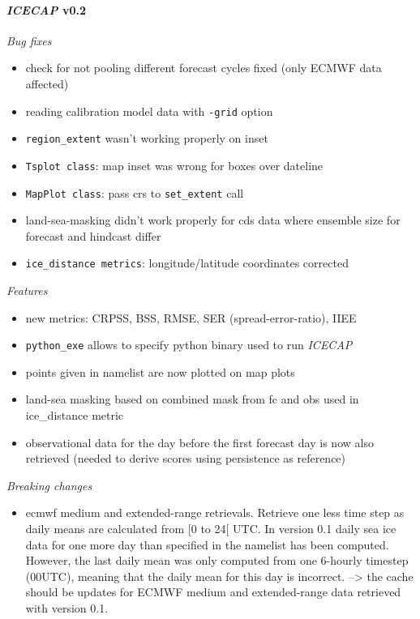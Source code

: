 \documentclass[DIV=10, parskip=full]{scrreprt}
\newcommand{\ice}{\textit{ICECAP}\xspace}
\begin{document}
\paragraph{\textbf{\ice v0.2\\[5pt]}}

\textit{Bug fixes}
\begin{itemize}
	\item check for not pooling different forecast cycles fixed (only ECMWF data affected)
	\item  reading calibration model data with \texttt{-grid} option
	\item \texttt{region\_extent} wasn't working properly on inset
	\item \texttt{Tsplot class}: map inset was wrong for boxes over dateline 
	\item \texttt{MapPlot class}: pass crs to \texttt{set\_extent} call
	\item land-sea-masking didn't work properly for cds data where ensemble size for forecast and hindcast  differ
	\item \texttt{ice\_distance metrics}: longitude/latitude coordinates corrected
	
\end{itemize}

\textit{Features}
\begin{itemize}
	\item new metrics: CRPSS, BSS, RMSE, SER (spread-error-ratio), IIEE
	\item \texttt{python\_exe} allows to specify python binary used to run \ice
	\item points given in namelist are now plotted on map plots
	\item land-sea masking based on combined mask from fc and obs used in ice\_distance metric
	\item observational data for the day before the first forecast day is now also retrieved (needed to derive scores using persistence as reference)
\end{itemize}

\textit{Breaking changes}
\begin{itemize}
	\item ecmwf medium and extended-range retrievals. Retrieve one less time step as daily means are calculated from [0 to 24[ UTC. In version 0.1 daily sea ice data for one more day than specified in the namelist has been computed. However, the last daily mean was only computed from one 6-hourly timestep (00UTC), meaning that the daily mean for this day is incorrect. --> the cache should be updates for ECMWF medium and extended-range data retrieved with version 0.1.
\end{itemize}



\clearpage
{}


\end{document}
